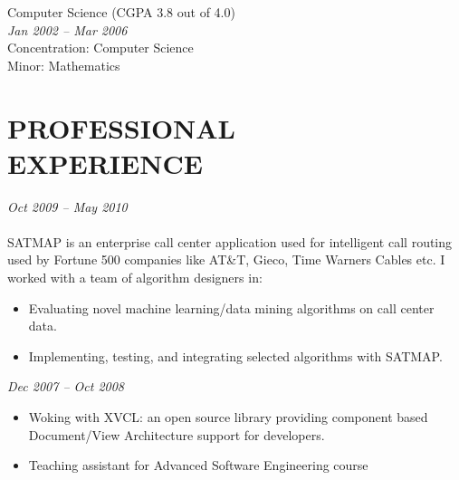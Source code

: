 \documentclass[margin, 10pt]{res} %
\begin{document}
\begin{resume}
{\bf \color{Black}{Bachelor of Science,}} Computer Science (CGPA 3.8 out of 4.0) \\
{\color{RubineRed}{University of Peshawar, Pakistan}} \hfill \textit{Jan 2002 -- Mar 2006} \\
Concentration: Computer Science \\
Minor: Mathematics

 
\section{PROFESSIONAL \\ EXPERIENCE}

{\sl {}} \hfill \textit{Oct 2009 -- May 2010} \\
{\color{RubineRed}{SATMAP Inc, Machine Learning Team, Pakistan}}  \\
SATMAP is an enterprise call center application used for intelligent call routing used by Fortune 500 companies like AT\&T, Gieco, Time Warners Cables etc. I worked with a team of algorithm designers in:

\begin{itemize} \itemsep -2pt %
\item Evaluating novel machine learning/data mining algorithms on call center data. 
\item Implementing, testing, and integrating selected algorithms with SATMAP. 
\end{itemize}
 
{\sl \textbf{}} \hfill \textit{Dec 2007 -- Oct 2008} \\
{\color{RubineRed}{Computer Science Department, LUMS, Pakistan}} 
\begin{itemize} 
\item Woking with XVCL: an open source library providing component based Document/View Architecture support for developers.
\item Teaching assistant for Advanced Software Engineering course
\end{itemize} 


\end{resume}
\end{document}
